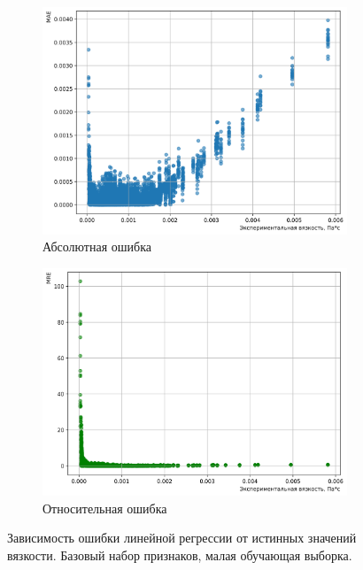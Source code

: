 \documentclass[a4paper,12pt]{article}
\begin{document}
    \begin{figure}[ht!]
      \centering
      \begin{subfigure}{0.48\textwidth}
          \centering
          \includegraphics[width=\linewidth]{linear_regression/MAE_Linear Model_0.8_base.png}
          \caption{Абсолютная ошибка}
      \end{subfigure}
      \hfill
      \begin{subfigure}{0.48\textwidth}
          \centering
          \includegraphics[width=\linewidth]{linear_regression/MRE_Linear Model_0.8_base.png}
          \caption{Относительная ошибка}
      \end{subfigure}
      \caption{Зависимость ошибки линейной регрессии от истинных значений вязкости. Базовый набор признаков, малая обучающая выборка.}
      \label{fig:linear_regression_errors_08_base}
    \end{figure}
    
\end{document}

